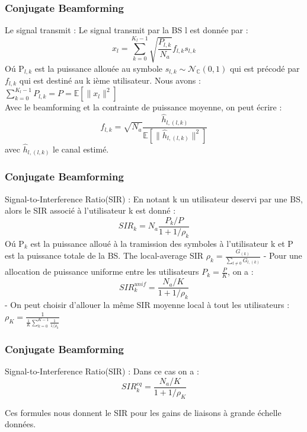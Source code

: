 \documentclass[pdf]{beamer}
\begin{document}
\begin{frame}[label=conjugateBeamforming]
\frametitle{Conjugate Beamforming}
\transblindshorizontal
\begin{exampleblock}{Le signal transmit :}
\justify
Le signal transmit par la BS l est donnée par : $$x_l = \sum_{k=0}^{K_l-1}\sqrt{\frac{P_{l,k}}{N_a}}f_{l,k}s_{l,k}$$
O\'u P$_{l,k}$ est la puissance allouée au symbole $s_{l,k} \sim \mathcal{N}_{\mathbb{C}}\left(0,1\right)$ qui est précodé par $f_{l,k}$ qui est destiné au k ième utilisateur.
Nous avons : $\displaystyle \sum_{k=0}^{K_l-1}P_{l,k}=P= \mathbb{E}\left[\|x_l\|^2\right]$\\
Avec le beamforming et la contrainte de puissance moyenne, on peut écrire : 
$$f_{l,k} = \sqrt{N_a}\frac{\hat{h}_{l,(l,k)}}{\mathbb{E}\left[\|\hat{h}_{l,(l,k)}\|^2\right]}$$ avec $\hat{h}_{l,(l,k)}$ le canal estimé.
\end{exampleblock}
\end{frame}

\begin{frame}[label=conjugateBeamforming]
\frametitle{Conjugate Beamforming}
\transblindshorizontal
\begin{exampleblock}{Signal-to-Interference Ratio(SIR) :}
\justify
En notant k un utilisateur deservi par une BS, alors le SIR associé à l'utilisateur k est donné : $$SIR_k = N_a \frac{P_k/P}{1+1/\rho_k}$$
O\'u P$_k$ est la puissance alloué à la tramission des symboles à l'utilisateur k et P est la puissance totale de la BS. The local-average SIR $\displaystyle \rho_k = \frac{G_{(k)}}{\sum_{l \neq 0}G_{l, (k)}}$ 
- Pour une allocation de puissance uniforme entre les utilisateurs  $P_k=\frac{P}{K}$, on a : $$SIR_{k}^{unif} = \frac{N_a/K}{1+1/\rho_k}$$
- On peut choisir d'allouer la même SIR moyenne local à tout les utilisateurs : $\displaystyle \rho_K = \frac{1}{\frac{1}{K}\sum_{k=0}^{K-1}\frac{1}{1/\rho_k}}$
\end{exampleblock}
\end{frame}

\begin{frame}[label=conjugateBeamforming]
\frametitle{Conjugate Beamforming}
\transblindshorizontal
\begin{exampleblock}{Signal-to-Interference Ratio(SIR) :}
\justify
Dans ce cas on a : $$SIR_{k}^{eq} = \frac{N_a/K}{1+1/\rho_K}$$
\end{exampleblock}
Ces formules nous donnent le SIR pour les gains de liaisons à grande échelle données. 
\end{frame}
\end{document}
